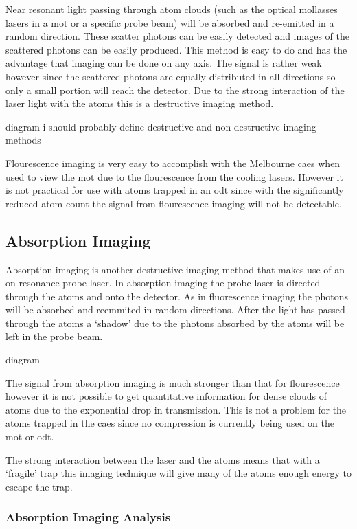 Near resonant light passing through atom clouds (such as the optical mollasses lasers in a \gls{mot} or a specific probe beam) will be absorbed and re-emitted in a random direction. These scatter photons can be easily detected and images of the scattered photons can be easily produced. This method is easy to do and has the advantage that imaging can be done on any axis. The signal is rather weak however since the scattered photons are equally distributed in all directions so only a small portion will reach the detector. Due to the strong interaction of the laser light with the atoms this is a destructive imaging method.

{\color{red} diagram}
{\color{red} i should probably define destructive and non-destructive imaging methods}

Flourescence imaging is very easy to accomplish with the Melbourne \gls{caes} when used to view the \gls{mot} due to the flourescence from the cooling lasers. However it is not practical for use with atoms trapped in an \gls{odt} since with the significantly reduced atom count the signal from flourescence imaging will not be detectable.

\subsection{Absorption Imaging}

Absorption imaging is another destructive imaging method that makes use of an on-resonance probe laser. In absorption imaging the probe laser is directed through the atoms and onto the detector. As in fluorescence imaging the photons will be absorbed and reemmited in random directions. After the light has passed through the atoms a `shadow' due to the photons absorbed by the atoms will be left in the probe beam.

{\color{red} diagram}

The signal from absorption imaging is much stronger than that for flourescence however it is not possible to get quantitative information for dense clouds of atoms due to the exponential drop in transmission\cite{moravchik_imaging_2009}. This is not a problem for the atoms trapped in the \gls{caes} since no compression is currently being used on the \gls{mot} or \gls{odt}.

The strong interaction between the laser and the atoms means that with a `fragile' trap this imaging technique will give many of the atoms enough energy to escape the trap.

\subsubsection{Absorption Imaging Analysis}

